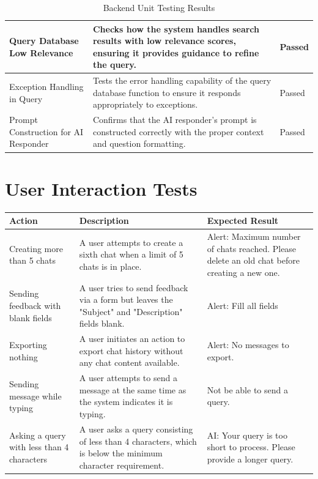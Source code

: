 \documentclass{l4proj}
\begin{document}
\begin{appendices}
\begin{table}[!ht]
\begin{tabular}{
    |>{\centering\arraybackslash}m{3.5cm}
    |m{7.5cm}
    |>{\centering\arraybackslash}m{2.5cm}|}
\hline
Query Database Low Relevance & Checks how the system handles search results with low relevance scores, ensuring it provides guidance to refine the query. & Passed \\
\hline
\rowcolor{RowColor}Exception Handling in Query & Tests the error handling capability of the query database function to ensure it responds appropriately to exceptions. & Passed \\
\hline
Prompt Construction for AI Responder & Confirms that the AI responder's prompt is constructed correctly with the proper context and question formatting. & Passed \\
\hline
\end{tabular}
\caption{Backend Unit Testing Results}

\end{table}
\section*{User Interaction Tests}
\begin{table}[!ht]
\centering
\renewcommand{\arraystretch}{2.5} %
\begin{tabular}{
    |>{\centering\arraybackslash}m{3.5cm}
    |m{7.5cm}
    |>{\centering\arraybackslash}m{2.5cm}|}
\hline
\rowcolor{HeaderColor}Action & Description & Expected Result \\
\hline
\rowcolor{RowColor}Creating more than 5 chats & A user attempts to create a sixth chat when a limit of 5 chats is in place. & Alert: Maximum number of chats reached. Please delete an old chat before creating a new one.\\
\hline
Sending feedback with blank fields & A user tries to send feedback via a form but leaves the "Subject" and "Description" fields blank. & Alert: Fill all fields \\
\hline
\rowcolor{RowColor}Exporting nothing & A user initiates an action to export chat history without any chat content available. & Alert: No messages to export. \\
\hline
Sending message while typing & A user attempts to send a message at the same time as the system indicates it is typing. & Not be able to send a query. \\
\hline
\rowcolor{RowColor}Asking a query with less than 4 characters & A user asks a query consisting of less than 4 characters, which is below the minimum character requirement. & AI: Your query is too short to process. Please provide a longer query. \\
\hline
\end{tabular}
\end{table}



\end{appendices}
\end{document}

